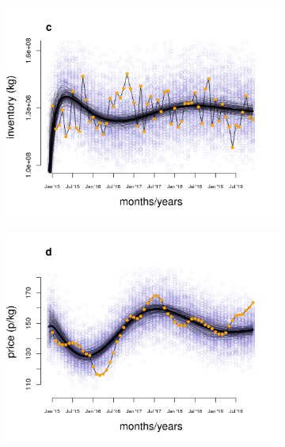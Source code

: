 \documentclass[12pt]{article}
\begin{document}
\begin{figure}[t!]
  \begin{subfigure}{0.5\textwidth}
    \includegraphics[scale=0.5]{figure_3c.png}
  \end{subfigure}%
  \begin{subfigure}{0.5\textwidth}
    \includegraphics[scale=0.5]{figure_3d.png}
  \end{subfigure}


\end{figure}
\end{document}

